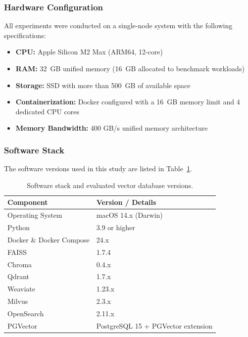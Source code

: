 \documentclass{article}
\begin{document}
\subsubsection{Hardware Configuration}
All experiments were conducted on a single-node system with the following specifications:
\begin{itemize}
    \item  \textbf{CPU:} Apple Silicon M2 Max (ARM64, 12-core)
    \item \textbf{RAM:} 32~GB unified memory (16~GB allocated to benchmark workloads)
    \item \textbf{Storage:} SSD with more than 500~GB of available space
    \item \textbf{Containerization:} Docker configured with a 16~GB memory limit and 4 dedicated CPU cores
    \item \textbf{Memory Bandwidth:} 400 GB/s unified memory architecture
\end{itemize}

\subsubsection{Software Stack}
The software versions used in this study are listed in Table~\ref{tab:software_stack}.
\begin{table}[h]
\centering
\small
\caption{Software stack and evaluated vector database versions.}
\label{tab:software_stack}
\begin{tabular}{ll}
\hline
\textbf{Component} & \textbf{Version / Details} \\
\hline
Operating System & macOS 14.x (Darwin) \\
Python & 3.9 or higher \\
Docker \& Docker Compose & 24.x \\
\hline
FAISS & 1.7.4 \\
Chroma & 0.4.x \\
Qdrant & 1.7.x \\
Weaviate & 1.23.x \\
Milvus & 2.3.x \\
OpenSearch & 2.11.x \\
PGVector & PostgreSQL 15 + PGVector extension \\
\hline
\end{tabular}
\end{table}
\end{document}
